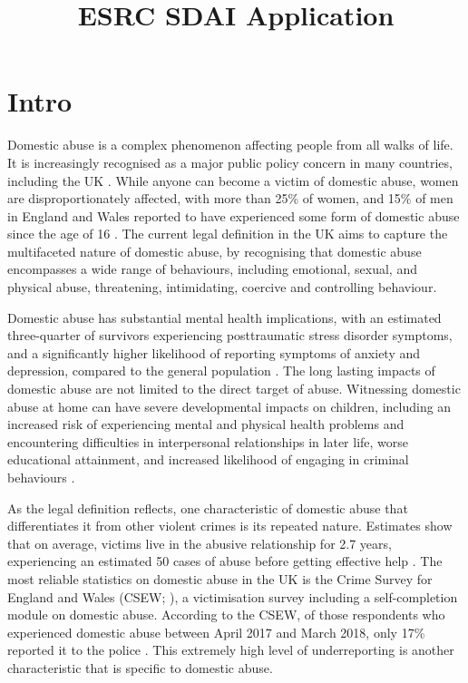 \documentclass[11pt, a4paper]{article}
\begin{document}
\title{ESRC SDAI Application}
\date{}
\maketitle

\section{Intro}

Domestic abuse is a complex phenomenon affecting people from all walks of life. It is increasingly recognised as a major public policy concern in many countries, including the UK \cite{ep}. While anyone can become a victim of domestic abuse, women are disproportionately affected, with more than 25\% of women, and 15\% of men in England and Wales reported to have experienced some form of domestic abuse since the age of 16 \cite{ONS}.  The current legal definition in the UK \cite{govuk} aims to capture the multifaceted nature of domestic abuse, by recognising that domestic abuse encompasses a wide range of behaviours, including emotional, sexual, and physical abuse, threatening, intimidating, coercive and controlling behaviour. 

Domestic abuse has substantial mental health implications, with an estimated three-quarter of survivors experiencing posttraumatic stress disorder symptoms, and a significantly higher likelihood of reporting symptoms of anxiety and depression, compared to the general population \cite{ferrari}. The long lasting impacts of domestic abuse are not limited to the direct target of abuse. Witnessing domestic abuse at home can have severe developmental impacts on children, including an increased risk of experiencing mental and physical health problems and encountering difficulties in interpersonal relationships in later life, worse educational attainment, and increased likelihood of engaging in criminal behaviours \cite{callaghan}.

As the legal definition reflects, one characteristic of domestic abuse that differentiates it from other violent crimes is its repeated nature. Estimates show that on average, victims live in the abusive relationship for 2.7 years, experiencing an estimated 50 cases of abuse before getting effective help \cite{SafeLives2015}. The most reliable statistics on domestic abuse in the UK is the Crime Survey for England and Wales (CSEW; ), a victimisation survey including a self-completion module on domestic abuse. According to the CSEW, of those respondents who experienced domestic abuse between April 2017 and March 2018, only 17\% reported it to the police \cite{ONS}. This extremely high level of underreporting is another characteristic that is specific to domestic abuse. 
\end{document}
